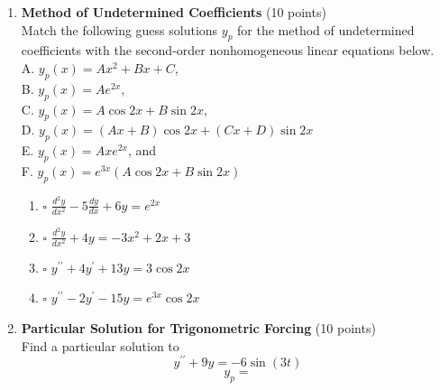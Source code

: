 \begin{enumerate}
  \item \textbf{Method of Undetermined Coefficients} (10 points)\\
  Match the following guess solutions $y_p$ for the method of undetermined coefficients with the second-order nonhomogeneous linear equations below.\\
  A. $y_p(x)=A x^2+B x+C$,\\
  B. $y_p(x)=A e^{2 x}$,\\
  C. $y_p(x)=A \cos 2 x+B \sin 2 x$,\\
  D. $y_p(x)=(A x+B) \cos 2 x+(C x+D) \sin 2 x$\\
  E. $y_p(x)=A x e^{2 x}$, and\\
  F. $y_p(x)=e^{3 x}(A \cos 2 x+B \sin 2 x)$\\
  \begin{enumerate}[label=\arabic*.]
    \item $\square$ $\frac{d^2 y}{d x^2}-5 \frac{d y}{d x}+6 y=e^{2 x}$\\
    \begin{subanswer}
    \end{subanswer}
    \item $\square$ $\frac{d^2 y}{d x^2}+4 y=-3 x^2+2 x+3$\\
    \begin{subanswer}
    \end{subanswer}
    \item $\square$ $y^{\prime \prime}+4 y^{\prime}+13 y=3 \cos 2 x$\\
    \begin{subanswer}
    \end{subanswer}
    \item $\square$ $y^{\prime \prime}-2 y^{\prime}-15 y=e^{3 x} \cos 2 x$\\
    \begin{subanswer}
    \end{subanswer}
  \end{enumerate}

  \item \textbf{Particular Solution for Trigonometric Forcing} (10 points)\\
  Find a particular solution to
  $$
  y^{\prime \prime}+9 y=-6 \sin (3 t)
  $$
  $$
  y_p=
  $$
  \begin{subanswer}
  \end{subanswer}


\end{enumerate}
